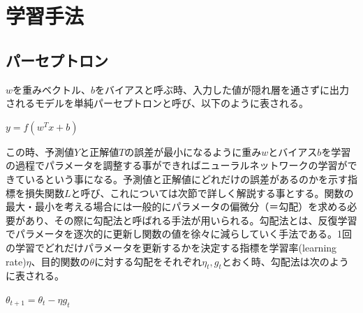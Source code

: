 \documentclass{article}
\begin{document}
\newpage
\section{学習手法}
\subsection{パーセプトロン}

\begin{math}w\end{math}を重みベクトル、\begin{math}b\end{math}をバイアスと呼ぶ時、入力した値が隠れ層を通さずに出力されるモデルを単純パーセプトロンと呼び、以下のように表される。

\begin{center}
\begin{math}
y = f(w^{T}x+b)
\end{math}
\end{center}

この時、予測値\begin{math}Y\end{math}と正解値\begin{math}T\end{math}の誤差が最小になるように重み\begin{math}w\end{math}とバイアス\begin{math}b\end{math}を学習の過程でパラメータを調整する事ができればニューラルネットワークの学習ができているという事になる。予測値と正解値にどれだけの誤差があるのかを示す指標を損失関数\begin{math}L\end{math}と呼び、これについては次節で詳しく解説する事とする。関数の最大・最小を考える場合には一般的にパラメータの偏微分（＝勾配）を求める必要があり、その際に勾配法と呼ばれる手法が用いられる。勾配法とは、反復学習でパラメータを逐次的に更新し関数の値を徐々に減らしていく手法である。1回の学習でどれだけパラメータを更新するかを決定する指標を学習率(learning rate)\begin{math}\eta\end{math}、目的関数の\begin{math}\theta\end{math}に対する勾配をそれぞれ\begin{math}\eta_t,g_t\end{math}とおく時、勾配法は次のように表される。

\begin{center}
\begin{math}
\theta_{t+1} = \theta_t - \eta g_t
\end{math}
\end{center}
\end{document}
